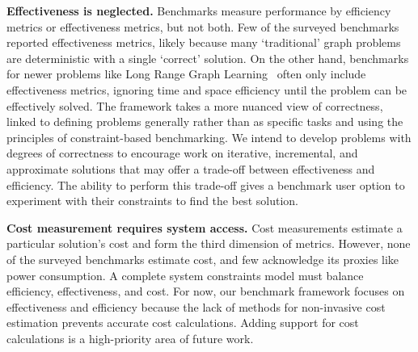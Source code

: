 \textbf{Effectiveness is neglected.}
Benchmarks measure performance by efficiency metrics or effectiveness metrics, but not both.
Few of the surveyed benchmarks reported effectiveness metrics, likely because many `traditional' graph problems are deterministic with a single `correct' solution.
On the other hand, benchmarks for newer problems like Long Range Graph Learning~\cite{Dwivedi2022} often only include effectiveness metrics, ignoring time and space efficiency until the problem can be effectively solved.
The \gai framework takes a more nuanced view of correctness, linked to defining problems generally rather than as specific tasks and using the principles of constraint-based benchmarking.
We intend to develop problems with degrees of correctness to encourage work on iterative, incremental, and approximate solutions that may offer a trade-off between effectiveness and efficiency. 
The ability to perform this trade-off gives a benchmark user option to experiment with their constraints to find the best solution.

\textbf{Cost measurement requires system access.}
Cost measurements estimate a particular solution's cost and form the third dimension of metrics. 
However, none of the surveyed benchmarks estimate cost, and few acknowledge its proxies like power consumption. 
A complete system constraints model must balance efficiency, effectiveness, and cost. 
For now, our \gai benchmark framework focuses on effectiveness and efficiency because the lack of methods for non-invasive cost estimation prevents accurate cost calculations.
Adding support for cost calculations is a high-priority area of future work.




